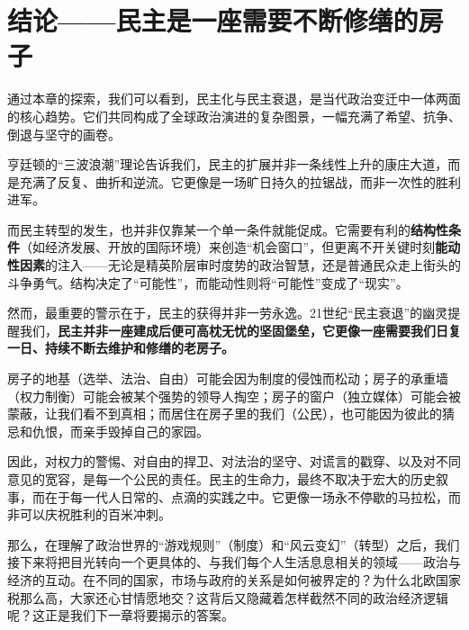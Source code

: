 \section{结论——民主是一座需要不断修缮的房子}

通过本章的探索，我们可以看到，民主化与民主衰退，是当代政治变迁中一体两面的核心趋势。它们共同构成了全球政治演进的复杂图景，一幅充满了希望、抗争、倒退与坚守的画卷。

亨廷顿的“三波浪潮”理论告诉我们，民主的扩展并非一条线性上升的康庄大道，而是充满了反复、曲折和逆流。它更像是一场旷日持久的拉锯战，而非一次性的胜利进军。

而民主转型的发生，也并非仅靠某一个单一条件就能促成。它需要有利的\textbf{结构性条件}（如经济发展、开放的国际环境）来创造“机会窗口”，但更离不开关键时刻\textbf{能动性因素}的注入——无论是精英阶层审时度势的政治智慧，还是普通民众走上街头的斗争勇气。结构决定了“可能性”，而能动性则将“可能性”变成了“现实”。

然而，最重要的警示在于，民主的获得并非一劳永逸。21世纪“民主衰退”的幽灵提醒我们，\textbf{民主并非一座建成后便可高枕无忧的坚固堡垒，它更像一座需要我们日复一日、持续不断去维护和修缮的老房子。}

房子的地基（选举、法治、自由）可能会因为制度的侵蚀而松动；房子的承重墙（权力制衡）可能会被某个强势的领导人掏空；房子的窗户（独立媒体）可能会被蒙蔽，让我们看不到真相；而居住在房子里的我们（公民），也可能因为彼此的猜忌和仇恨，而亲手毁掉自己的家园。

因此，对权力的警惕、对自由的捍卫、对法治的坚守、对谎言的戳穿、以及对不同意见的宽容，是每一个公民的责任。民主的生命力，最终不取决于宏大的历史叙事，而在于每一代人日常的、点滴的实践之中。它更像一场永不停歇的马拉松，而非可以庆祝胜利的百米冲刺。

那么，在理解了政治世界的“游戏规则”（制度）和“风云变幻”（转型）之后，我们接下来将把目光转向一个更具体的、与我们每个人生活息息相关的领域——政治与经济的互动。在不同的国家，市场与政府的关系是如何被界定的？为什么北欧国家税那么高，大家还心甘情愿地交？这背后又隐藏着怎样截然不同的政治经济逻辑呢？这正是我们下一章将要揭示的答案。